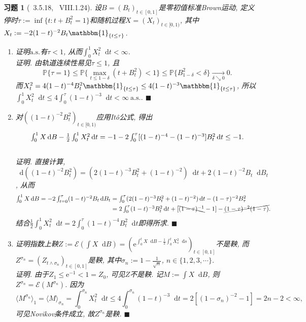 \documentclass{ctexart}
\theoremstyle{definition}
\theoremstyle{remark}
\theoremstyle{plain}
\newtheorem{Ex}{习题}[section]
\newenvironment{Prf}{\vspace{1ex}\textbf{\\}{\color{red}\textit{证明}}.\normalfont}{\color{red}\hfill$\blacksquare$\vspace{1ex}\par}
\newcommand{\1}{\mathbbm{1}}				%
\newcommand{\as}{\mathrm{a.s.}}				%
\renewcommand{\P}{\mathbb{P}}				%
\newcommand{\agp}[1]{\langle #1 \rangle}	%
\newcommand{\tint}{\textstyle\int\nolimits}
\renewcommand*{\d}{\mathop{}\!\mathrm{d}}	%
\newcommand{\e}{\mathrm{e}}
\begin{document}
\begin{Ex}[\cite{Karatzas-Shreve--GTM113}~3.5.18, \cite{Revuz-Yor}~VIII.1.24]
设$B = (B_{t})_{t \in [0,1]}$是零初值标准Brown运动, 定义停时$\tau := \inf\{ t : t + B_{t}^{2} = 1 \}$和随机过程$X = (X_{t})_{t \in [0,1)}$, 其中$X_{t} := -2(1-t)^{-2}B_{t}\1_{\{t\le\tau\}}$.
\begin{enumerate}
	\setlength{\itemsep}{0ex}
\item 证明$\as$有$\tau < 1$, 从而$\int_{0}^{1} X_{t}^{2} \d t < \infty$.
\begin{Prf}
由轨道连续性易见$\tau \le 1$, 且\[ \P\{ \tau = 1 \} \le \P\{ \max_{t \le 1-\delta} (t+B_{t}^{2}) < 1 \} \le \P\{ B_{1-\delta}^{2} < \delta \} \xrightarrow[\delta \searrow 0]{} 0 . \]
而$X_{t}^{2} = 4(1-t)^{-4}B_{t}^{2}\1_{\{t\le\tau\}} \le 4(1-t)^{-3}\1_{\{t\le\tau\}}$, 所以$\int_{0}^{1} X_{t}^{2} \d t \le 4 \int_{0}^{\tau} (1-t)^{-3} \d t < \infty ~\as$.
\end{Prf}
\item 对$((1-t)^{-2}B_{t}^{2})_{t \in [0,1)}$应用It\^{o}公式, 得出\[ \tint_{0}^{1} X \d B - \frac{1}{2}\int_{0}^{1} X_{t}^{2} \d t = -1 -2 \int_{0}^{\tau} [(1-t)^{-4}-(1-t)^{-3}] B_{t}^{2} \d t \le -1 . \vspace{-4.5ex}\]
\begin{Prf}
直接计算, $\d ((1-t)^{-2}B_{t}^{2}) = (2(1-t)^{-3}B_{t}^{2} + (1-t)^{-2}) \d t + 2(1-t)^{-2}B_{t} \d B_{t}$, 从而
\[\begin{aligned}
\tint_{0}^{1} X \d B = -2 \tint_{t=0}^{\tau} (1-t)^{-2}B_{t} \d B_{t} 
&= \tint_{0}^{\tau} (2(1-t)^{-3}B_{t}^{2} + (1-t)^{-2}) \d t - (1-\tau)^{-2}B_{\tau}^{2} \\
&= 2 \tint_{0}^{\tau} (1-t)^{-3}B_{t}^{2} \d t + [\bcancel{(1-\tau)^{-1}}-1] - \cancel{(1-\tau)^{-2}(1-\tau)} .
\end{aligned}\]
结合$\frac{1}{2}\int_{0}^{1} X_{t}^{2} \d t = 2 \int_{0}^{\tau} (1-t)^{-4}B_{t}^{2} \d t$即得所求.
\end{Prf}
\item 证明指数上鞅$Z := \mathcal{E}(\int X \d B) = (\e^{\int_{0}^{t} X \d B - \frac{1}{2}\int_{0}^{t} X_{s}^{2} \d s})_{t \in [0,1]}$不是鞅, 而$Z^{\sigma_{n}} = (Z_{t\wedge\sigma_{n}})_{t \in [0,1]}$是鞅, 其中$\sigma_{n} := 1-\frac{1}{\sqrt{n}}$, $n \in \{1,2,3,\cdots\}$.
\begin{Prf}
由于$Z_{1} \le \e^{-1} < 1 = Z_{0}$, 可见$Z$不是鞅. 记$M := \int X \d B$, 则$Z^{\sigma_{n}} = \mathcal{E}(M^{\sigma_{n}})$. 因为
\[ \agp{M^{\sigma_{n}}}_{1} = \agp{M}_{\sigma_{n}} = \tint_{0}^{\sigma_{n}} X_{t}^{2} \d t \le 4 \int_{0}^{\sigma_{n}} (1-t)^{-3} \d t = 2[(1-\sigma_{n})^{-2}-1] = 2n-2 < \infty , \]
可见Novikov条件成立, 故$Z^{\sigma_{n}}$是鞅.
\end{Prf}
\end{enumerate}
\end{Ex}
\end{document}
